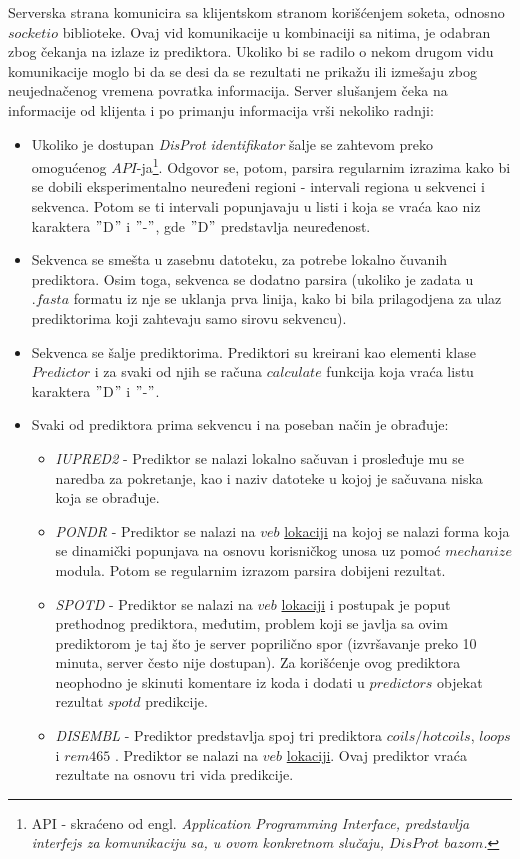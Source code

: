 Serverska strana komunicira sa klijentskom stranom korišćenjem soketa, odnosno $socketio$ biblioteke. Ovaj vid komunikacije u kombinaciji sa nitima, je odabran zbog čekanja na izlaze iz prediktora. Ukoliko bi se radilo o nekom drugom vidu komunikacije moglo bi da se desi da se rezultati ne prikažu ili izmešaju zbog neujednačenog vremena povratka informacija. Server slušanjem čeka na informacije od klijenta i po primanju informacija vrši nekoliko radnji:
\begin{itemize}
\item Ukoliko je dostupan \textit{DisProt} \textit{identifikator} šalje se zahtevom preko omogućenog $API$-ja\footnote{API - skraćeno od engl. \em{Application Programming Interface}, predstavlja interfejs za komunikaciju sa, u ovom konkretnom slučaju, $DisProt$ $bazom$. }. Odgovor se, potom, parsira regularnim izrazima kako bi se dobili eksperimentalno neuređeni regioni - intervali regiona u sekvenci i sekvenca. Potom se ti intervali popunjavaju u listi i koja se vraća kao niz karaktera $"$D$"$ i $"$-$"$, gde $"$D$"$ predstavlja neuređenost.
\item Sekvenca se smešta u zasebnu datoteku, za potrebe lokalno čuvanih prediktora. Osim toga, sekvenca se dodatno parsira (ukoliko je zadata u $.fasta$ formatu iz nje se uklanja prva linija, kako bi bila prilagodjena za ulaz prediktorima koji zahtevaju samo sirovu sekvencu).
\item Sekvenca se šalje prediktorima. Prediktori su kreirani kao elementi klase $Predictor$ i za svaki od njih se računa $calculate$ funkcija koja vraća listu karaktera $"$D$"$ i $"$-$"$.
\item Svaki od prediktora prima sekvencu i na poseban način je obrađuje:
	\begin{itemize}
	\item \textit{IUPRED2} - Prediktor se nalazi lokalno sačuvan i prosleđuje mu se naredba za pokretanje, kao i naziv datoteke u kojoj je sačuvana niska koja se obrađuje.  
	\item \textit{PONDR} - Prediktor se nalazi na $veb$  \href{http://www.pondr.com/cgi-bin/pondr.cgi}{lokaciji} na kojoj se nalazi forma koja se dinamički popunjava na osnovu korisničkog unosa uz pomoć $mechanize$ modula. Potom se regularnim izrazom parsira dobijeni rezultat.  
	\item \textit{SPOTD} - Prediktor se nalazi na $veb$ \href{http://sparks-lab.org/server/SPOT-disorder/}{lokaciji} i postupak je poput prethodnog prediktora, međutim, problem koji se javlja sa ovim prediktorom je taj što je server poprilično spor (izvršavanje preko 10 minuta, server često nije dostupan). Za korišćenje ovog prediktora neophodno je skinuti komentare iz koda i dodati u $predictors$ objekat rezultat $spotd$ predikcije.
	\item \textit{DISEMBL} - Prediktor predstavlja spoj tri prediktora $coils/hotcoils$, $loops$ i $rem465$ . Prediktor se nalazi na $veb$ \href{http://dis.embl.de/cgiDict.py}{lokaciji}. Ovaj prediktor vraća rezultate na osnovu tri vida predikcije. 
	\end{itemize}
\end{itemize}

